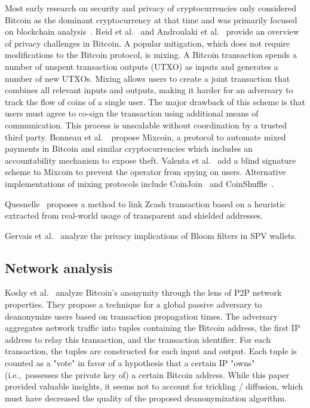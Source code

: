 Most early research on security and privacy of cryptocurrencies only considered Bitcoin as the dominant cryptocurrency at that time and was primarily focused on blockchain analysis~\cite{Meiklejohn2013, Ober2013, Ron2013}.
Reid et al.~\cite{Reid2011} and Androulaki et al.~\cite{Androulaki2013} provide an overview of privacy challenges in Bitcoin.
A popular mitigation, which does not require modifications to the Bitcoin protocol, is mixing.
A Bitcoin transaction spends a number of unspent transaction outputs (UTXO) as inputs and generates a number of new UTXOs.
Mixing allows users to create a joint transaction that combines all relevant inputs and outputs, making it harder for an adversary to track the flow of coins of a single user.
The major drawback of this scheme is that users must agree to co-sign the transaction using additional means of communication.
This process is unscalable without coordination by a trusted third party.
Bonneau et al.~\cite{Bonneau2014}~propose Mixcoin, a protocol to automate mixed payments in Bitcoin and similar cryptocurrencies which includes an accountability mechanism to expose theft.
Valenta et al.~\cite{Valenta2015} add a blind signature scheme to Mixcoin to prevent the operator from spying on users.
Alternative implementations of mixing protocols include CoinJoin~\cite{Maxwell2013} and CoinShuffle~\cite{Ruffing2014}.


Quesnelle~\cite{Quesnelle2017} proposes a method to link Zcash transaction based on a heuristic extracted from real-world usage of transparent and shielded addresses.

Gervais et al.~\cite{Gervais2014} analyze the privacy implications of Bloom filters in SPV wallets.

\subsection{Network analysis}

Koshy et al.~\cite{Koshy2014} analyze Bitcoin's anonymity through the lens of P2P network properties.
They propose a technique for a global passive adversary to deanonymize users based on transaction propagation times.
The adversary aggregates network traffic into tuples containing the Bitcoin address, the first IP address to relay this transaction, and the transaction identifier.
For each transaction, the tuples are constructed for each input and output.
Each tuple is counted as a "vote" in favor of a hypothesis that a certain IP "owns" (i.e.,~possesses the private key of) a certain Bitcoin address.
While this paper provided valuable insights, it seems not to account for trickling / diffusion, which must have decreased the quality of the proposed deanonymization algorithm.

